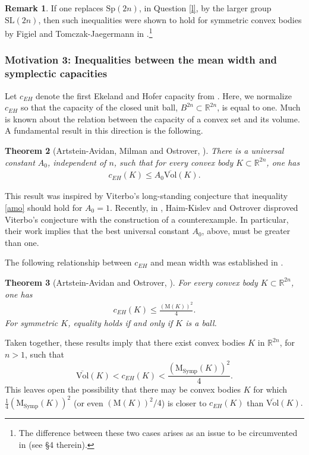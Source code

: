 \documentclass[12pt]{amsart}
\newtheorem{theorem}{Theorem}[section]
\theoremstyle{definition}
\newtheorem{remark}[theorem]{Remark}
\newcommand\Symp{\operatorname{Symp}}
\newcommand{\RR}{{\mathbb R}}
\newcommand{\mw}{{{\mathrm {M}}}}
\newcommand{\nlmw}{\mathrm{M}_{{\Symp}}}
\newcommand{\sv}{{\overline{{\mathrm{Vol}}}}}
\begin{document}
\begin{remark}If one replaces $\mathrm{Sp}(2n)$, in Question \ref{l}, by the larger group $\mathrm{SL}(2n)$, then such inequalities were shown to hold for symmetric convex bodies by Figiel and Tomczak-Jaegermann in \cite{ft}.\footnote{The difference between these two cases arises as an issue to be circumvented in \cite{ao-n} (see \S 4 therein).} \end{remark}

\subsubsection{Motivation 3: Inequalities between the mean width and symplectic capacities} Let $c_{EH}$ denote the first Ekeland and Hofer capacity from \cite{eh1}. Here, we normalize $c_{EH}$ so that the capacity of the closed unit ball, $B^{2n} \subset \RR^{2n}$, is equal to one. Much is known about the relation between the capacity of a convex set and its volume. A fundamental result in this direction is the following.

\begin{theorem}[Artstein-Avidan, Milman and Ostrover, \cite{amo}]
  There is a universal constant $A_0$, independent of $n$, such that for every convex body $K \subset \RR^{2n}$, one has
\begin{align}\label{amo}
    c_{EH}(K) \leq A_0 \sv(K).
\end{align}
\end{theorem}
This result was inspired by Viterbo's long-standing conjecture that inequality \eqref{amo} should hold for $A_0=1$. Recently, in \cite{hko}, Haim-Kislev and Ostrover disproved Viterbo's conjecture with the construction of a counterexample. In particular, their work implies that the best universal constant $A_0$, above, must be greater than one. 


The following relationship between $c_{EH}$ and mean width was established in \cite{ao}.
\begin{theorem}[Artstein-Avidan and Ostrover, \cite{ao}]
    For every convex body $K \subset \RR^{2n}$, one has
\begin{align}\label{ao}
    c_{EH}(K) \leq \frac{(\mw(K))^2}{4}.
\end{align}
For symmetric $K$, equality holds if and only if $K$ is a ball.
\end{theorem}
Taken together, these results imply  that there exist convex bodies $K$ in $\RR^{2n}$, for $n>1$, such that 
\begin{equation}\label{weird}\sv(K) <  c_{EH}(K) < \frac{\left(\nlmw(K)\right)^2}{4}.\end{equation}
This leaves open the possibility that there may be convex bodies $K$ for which $\frac{1}{4}\left( \nlmw(K) \right)^2$ (or even $(\mw(K))^2/4$) is closer to $c_{EH}(K)$ than $\sv(K).$
\end{document}
